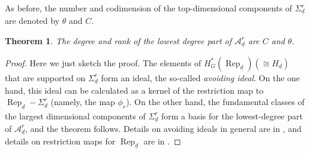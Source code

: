 \documentclass[a4paper]{amsart}
\DeclareMathOperator{\Rep}{\mathrm{Rep}}
\newcommand{\CA}{\mathcal{A}}
\newcommand{\ud}{\underline{d}}
\newtheorem{thm}{Theorem}[section]
\theoremstyle{plain}
\begin{document}
As before, the number and codimension of the top-dimensional components of $\Sigma_{\ud}^r$ are denoted by $\theta$ and $C$.

\begin{thm}\label{thm:UsingAvoidingIdeal}
    The degree and rank of the lowest degree part of $\CA^r_{\ud}$ are $C$ and $\theta$.  
\end{thm}

\begin{proof}
Here we just sketch the proof. The elements of $H_G^*(\Rep_{\ud})(\cong H_{\ud})$ that are supported on $\Sigma_{\ud}^r$ form an ideal, the so-called {\em avoiding ideal}. %
On the one hand, this ideal can be calculated as a kernel of the restriction map to $\Rep_{\ud}-\Sigma_{\ud}^r$ (namely, the map $\phi_r$). On the other hand, the fundamental classes of the largest dimensional components of $\Sigma_{\ud}^r$ form a basis for the lowest-degree part of $\CA_{\ud}^r$, and the theorem follows. Details on avoiding ideals in general are in \cite{FRavoiding}, and details on restriction maps for $\Rep_{\ud}$ are in \cite{FRduke}.
\end{proof}
\end{document}
